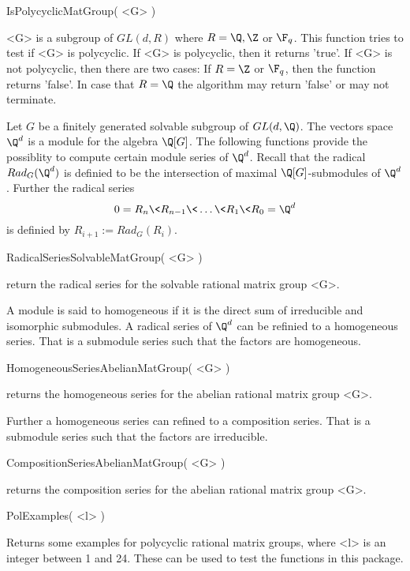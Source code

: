 \> IsPolycyclicMatGroup( <G> )

<G> is  a subgroup of $GL(d,R)$ where $R=\Q,\Z $ or $\F_q$.
 This function tries to test if <G> is polycyclic. If <G> is polycyclic,
 then it returns 'true'. 
If <G> is not polycyclic, then there are two cases: If $R=\Z$ or $\F_q$,
then the function returns 'false'. In case that $R=\Q$ the algorithm may
return 'false' or may not terminate.
 

Let $G$ be a finitely generated solvable subgroup of $GL(d,\Q)$. The vectors
space $\Q^d$ is a module for the algebra $\Q[G]$. The following
functions provide the possiblity to compute certain module series of
$\Q^d$. Recall that the radical $Rad_G(\Q^d)$ is definied to be the
intersection of maximal $\Q[G]$-submodules of $\Q^d$. Further the
radical series 
$$
0=R_n \< R_{n-1} \< \dots \< R_1 \< R_0=\Q^d 
$$
is definied by $R_{i+1}:= Rad_G(R_i)$. 

\> RadicalSeriesSolvableMatGroup( <G> )

return the radical series for the solvable rational matrix group
<G>. 

A module is said to homogeneous if it is the direct sum of
irreducible and isomorphic submodules. 
A radical series of $\Q^d$ can be refinied to a homogeneous series. 
That is a submodule series such that the factors are homogeneous.

\> HomogeneousSeriesAbelianMatGroup( <G> )

returns the homogeneous series for the abelian rational matrix group <G>.

Further a homogeneous series can refined to a composition series. That is
a submodule series such that the factors are irreducible.

\> CompositionSeriesAbelianMatGroup( <G> )

returns the composition series for the abelian rational matrix group <G>.


\> PolExamples( <l> )
 
Returns some examples for polycyclic rational matrix groups, where <l> 
is an integer
between 1 and 24. 
These can be used to test the functions in this package. 














